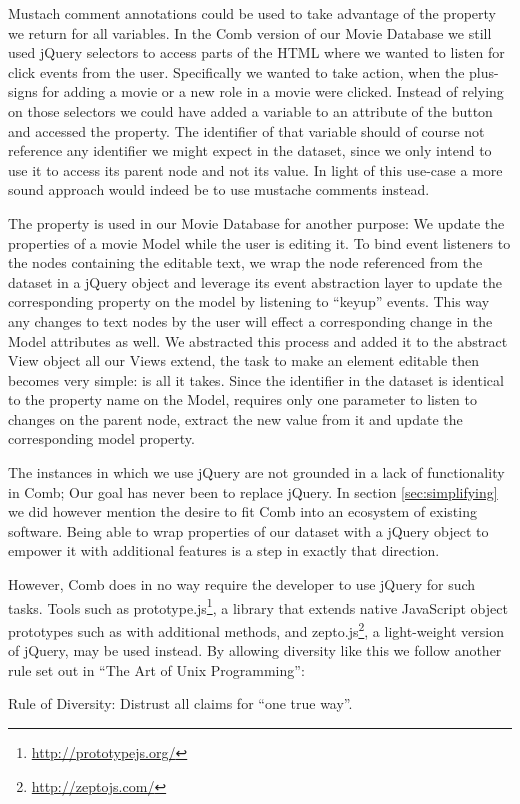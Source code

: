 \documentclass[thesis.tex]{subfiles}
\begin{document}
Mustach comment annotations could be used to take advantage of the
 property we return for all variables. In the Comb version
of our Movie Database we still used jQuery selectors to access parts of the HTML
where we wanted to listen for click events from the user. Specifically we wanted
to take action, when the plus-signs for adding a movie or a new role in a movie
were clicked.
Instead of relying on those selectors we could have added a variable to an
attribute of the button and accessed the  property.
The identifier of that variable should of course not reference any identifier we
might expect in the dataset, since we only intend to use it to access its parent
node and not its value.
In light of this use-case a more sound approach would indeed be to use mustache
comments instead.

The  property is used in our Movie Database for another
purpose: We update the properties of a movie Model while the user is editing it.
To bind event listeners to the nodes containing the editable text, we wrap the
node referenced from the dataset in a jQuery object and leverage its event
abstraction layer to update the corresponding property on the model by listening
to ``keyup'' events. This way any changes to text nodes by the user will effect
a corresponding change in the Model attributes as well.
We abstracted this process and added it to the abstract View object
all our Views extend, the task to make an element editable then becomes very
simple:  is all it takes. Since the identifier in the
dataset is identical to the property name on the Model, 
requires only one parameter to listen to changes on the parent node, extract the
new value from it and update the corresponding model property.

The instances in which we use jQuery are not grounded in a lack of functionality
in Comb; Our goal has never been to replace jQuery.
In section \ref{sec:simplifying} we did however mention the desire to fit Comb
into an ecosystem of existing software. Being able to wrap properties of our
dataset with a jQuery object to empower it with additional features is a step in
exactly that direction.

However, Comb does in no way require the developer to use jQuery for such tasks.
Tools such as prototype.js\footnote{\url{http://prototypejs.org/}}, a library
that extends native JavaScript object prototypes such as  with
additional methods, and zepto.js\footnote{\url{http://zeptojs.com/}}, a
light-weight version of jQuery, may be used instead.
By allowing diversity like this we follow another rule set out in
``The Art of Unix Programming'':
\begin{citequote}{\cite[Chapter 1]{UXART}}
Rule of Diversity: Distrust all claims for ``one true way''.
\end{citequote}
\end{document}
